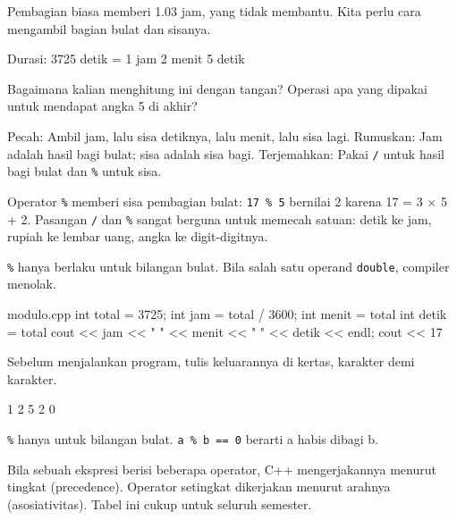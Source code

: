 \documentclass[a4paper]{article}
\begin{document}
Pembagian biasa memberi 1.03 jam, yang tidak membantu. Kita perlu cara mengambil bagian bulat dan sisanya.

\begin{MKeluaran}[title={Tampilan yang diinginkan}]
Durasi: 3725 detik
= 1 jam 2 menit 5 detik
\end{MKeluaran}
\begin{Tebak}
Bagaimana kalian menghitung ini dengan tangan? Operasi apa yang dipakai untuk mendapat angka 5 di akhir?
\end{Tebak}
\begin{Jawaban}
Pecah: Ambil jam, lalu sisa detiknya, lalu menit, lalu sisa lagi. Rumuskan: Jam adalah hasil bagi bulat; sisa adalah sisa bagi. Terjemahkan: Pakai \texttt{/} untuk hasil bagi bulat dan \texttt{\%} untuk sisa.
\end{Jawaban}
Operator \texttt{\%} memberi sisa pembagian bulat: \texttt{17 \% 5} bernilai 2 karena 17 = 3 × 5 + 2. Pasangan \texttt{/} dan \texttt{\%} sangat berguna untuk memecah satuan: detik ke jam, rupiah ke lembar uang, angka ke digit-digitnya.

\texttt{\%} hanya berlaku untuk bilangan bulat. Bila salah satu operand \texttt{double}, compiler menolak.

\begin{MKode}{modulo.cpp}
int total = 3725;
int jam = total / 3600;
int menit = total %
int detik = total %
cout << jam << " " << menit << " " << detik << endl;
cout << 17 %
\end{MKode}
\begin{Tebak}[]
Sebelum menjalankan program, tulis keluarannya di kertas, karakter demi karakter.
\end{Tebak}
\begin{Jawaban}[]
\begin{MKeluaran}[]
1 2 5
2 0
\end{MKeluaran}
\texttt{\%} hanya untuk bilangan bulat. \texttt{a \% b == 0} berarti a habis dibagi b.
\end{Jawaban}
Bila sebuah ekspresi berisi beberapa operator, C++ mengerjakannya menurut tingkat (precedence). Operator setingkat dikerjakan menurut arahnya (asosiativitas). Tabel ini cukup untuk seluruh semester.
\end{document}
